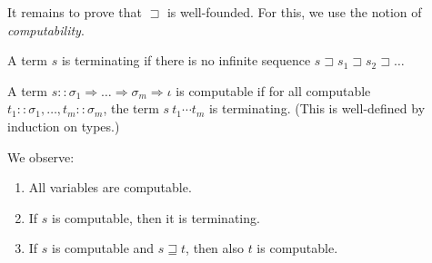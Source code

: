 \documentclass[a4paper,USenglish,cleveref,autoref,thm-restate]{lipics-v2021}
\newcommand{\arrtype}{\Rightarrow}
\newcommand{\grmain}{\sqsupset}
\newcommand{\geqmain}{\sqsupseteq}
\newcommand{\atype}{\sigma}
\newcommand{\asort}{\iota}
\begin{document}
It remains to prove that $\grmain$ is well-founded.  For this, we use the notion of
\emph{computability}.

\begin{definition}
A term $s$ is terminating if there is no infinite sequence $s \grmain s_1 \grmain s_2 \grmain \dots$

A term $s :: \atype_1 \arrtype \dots \arrtype \atype_m \arrtype \asort$ is computable if for all
computable $t_1 :: \atype_1,\dots,t_m :: \atype_m$, the term $s\ t_1 \cdots t_m$ is terminating.
(This is well-defined by induction on types.)
\end{definition}

\begin{lemma}\label{lem:computability:basics} We observe:
\begin{enumerate}
\item\label{lem:computability:basics:vars}
  All variables are computable.
\item\label{lem:computability:basics:compterm}
  If $s$ is computable, then it is terminating.
\item\label{lem:computability:basics:decrease}
  If $s$ is computable and $s \geqmain t$, then also $t$ is computable.
\end{enumerate}
\end{lemma}
\end{document}
